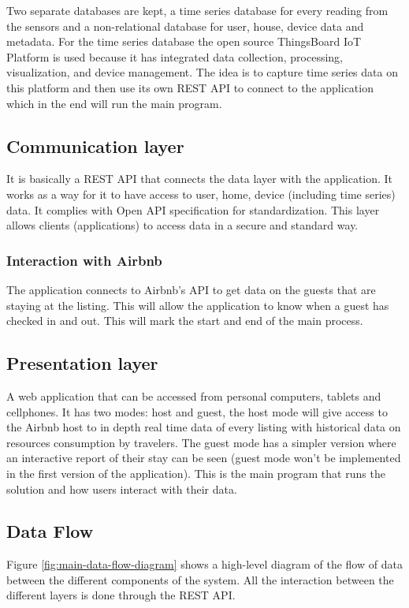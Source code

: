 \documentclass[12pt]{extarticle}
\begin{document}
Two separate databases are kept, a time series database for every reading from the sensors and a non-relational database for user, house, device data and metadata. For the time series 
database the open source ThingsBoard IoT Platform is used because it has integrated data collection, processing, visualization, and device management. The idea is to capture time 
series data on this platform and then use its own REST API to connect to the application which in the end will run the main program. 

\subsection{Communication layer}

It is basically a REST API that connects the data layer with the application. It works as a way for it to have access to user, home, device (including time series) data. 
It complies with Open API specification for standardization. This layer allows clients (applications) to access data in a secure and standard way.

\subsubsection{Interaction with Airbnb}

The application connects to Airbnb's API to get data on the guests that are staying at the listing. This will allow the application to know when a guest has checked in and out.
This will mark the start and end of the main process.

\subsection{Presentation layer}

A web application that can be accessed from personal computers, tablets and cellphones. It has two modes: host and guest, the host mode will give access to the Airbnb host to in 
depth real time data of every listing with historical data on resources consumption by travelers. The guest mode has a simpler version where an interactive report of their stay 
can be seen (guest mode won't be implemented in the first version of the application). This is the main program that runs the solution and how users interact with their data.

\subsection{Data Flow}
Figure \ref{fig:main-data-flow-diagram} shows a high-level diagram of the flow of data between the different components of the system. All the interaction between the different layers
is done through the REST API.
\end{document}
